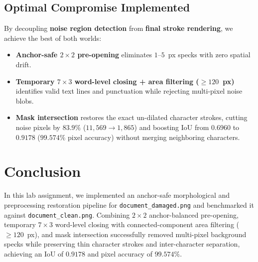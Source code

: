 \documentclass[12pt]{article}
\begin{document}
\subsection{Optimal Compromise Implemented}
By decoupling \textbf{noise region detection} from \textbf{final stroke rendering}, we achieve the best of both worlds:
\begin{itemize}
    \item \textbf{Anchor-safe $2 \times 2$ pre-opening} eliminates $1$--$5$~px specks with zero spatial drift.
    \item \textbf{Temporary $7 \times 3$ word-level closing + area filtering ($\ge 120$~px)} identifies valid text lines and punctuation while rejecting multi-pixel noise blobs.
    \item \textbf{Mask intersection} restores the exact un-dilated character strokes, cutting noise pixels by $83.9\%$ ($11{,}569 \to 1{,}865$) and boosting IoU from $0.6960$ to $0.9178$ ($99.574\%$ pixel accuracy) without merging neighboring characters.
\end{itemize}

\section{Conclusion}
In this lab assignment, we implemented an anchor-safe morphological and preprocessing restoration pipeline for \texttt{document\_damaged.png} and benchmarked it against \texttt{document\_clean.png}. Combining $2 \times 2$ anchor-balanced pre-opening, temporary $7 \times 3$ word-level closing with connected-component area filtering ($\ge 120$~px), and mask intersection successfully removed multi-pixel background specks while preserving thin character strokes and inter-character separation, achieving an IoU of $0.9178$ and pixel accuracy of $99.574\%$.
\end{document}
